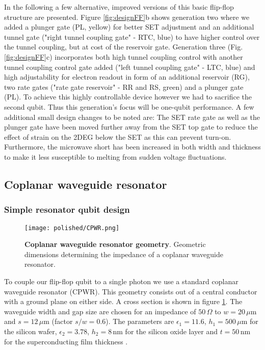 In the following a few alternative, improved versions of this basic flip-flop structure are presented. Figure \ref{fig:designFF}b shows generation two where we added a plunger gate (PL, yellow) for better SET adjustment and an additional tunnel gate ("right tunnel coupling gate" - RTC, blue) to have higher control over the tunnel coupling, but at cost of the reservoir gate. 
Generation three (Fig. \ref{fig:designFF}c) incorporates both high tunnel coupling control with another tunnel coupling control gate added ("left tunnel coupling gate" - LTC, blue) and high adjustability for electron readout in form of an additional reservoir (RG), two rate gates ("rate gate reservoir" - RR and RS, green) and a plunger gate (PL). To achieve this highly controllable device however we had to sacrifice the second qubit. Thus this generation's focus will be one-qubit performance.
A few additional small design changes to be noted are: The SET rate gate as well as the plunger gate have been moved further away from the SET top gate to reduce the effect of strain on the 2DEG below the SET as this can prevent turn-on. Furthermore, the microwave short has been increased in both width and thickness to make it less susceptible to melting from sudden voltage fluctuations. 

\subsection{Coplanar waveguide resonator} \label{sec:designCPWR}

\subsubsection*{Simple resonator qubit design} \label{sec:simple_res_design}

\begin{figure}
	\centering
	\texttt{[image: polished/CPWR.png]}
	\caption[Coplanar waveguide resonator geometry]{\textbf{Coplanar waveguide resonator geometry}. Geometric dimensions determining the impedance of a coplanar waveguide resonator.  }
	\label{fig:geometryCPWR}
\end{figure}

To couple our flip-flop qubit to a single photon we use a standard coplanar waveguide resonator (CPWR). This geometry consists out of a central conductor with a ground plane on either side. A cross section is shown in figure \ref{fig:geometryCPWR}. The waveguide width and gap size are chosen for an impedance of $50\,\Omega$ to $w=20\,\mu$m and $s=12\,\mu$m (factor $s/w=0.6$). The parameters are $\epsilon_{1}=11.6$, $h_1=500\,\mu$m for the silicon wafer, $\epsilon_2=3.78$, $h_2=8\,$nm for the silicon oxide layer and $t=50\,$nm for the superconducting film thickness  \cite{Jani2018}. 

